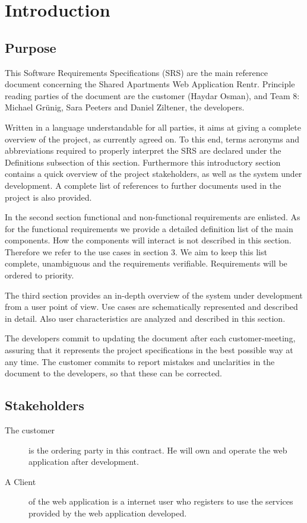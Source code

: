 \documentclass[a4wide]{article}
\title{}
\author{}
\begin{document}

\tableofcontents
\clearpage
\section{Introduction}
\subsection{Purpose}
This Software Requirements Specifications (SRS) are the main reference document concerning the Shared Apartments Web Application Rentr. Principle reading parties of the document are the customer (Haydar Osman), and Team 8: Michael Grünig, Sara Peeters and Daniel Ziltener, the developers.

Written in a language understandable for all parties, it aims at giving a complete overview of the project, as currently agreed on. To this end, terms acronyms and abbreviations required to properly interpret the SRS are declared under the Definitions subsection of this section. Furthermore this introductory section contains a quick overview of the project stakeholders, as well as the system under development. A complete list of references to further documents used in the project is also provided.

In the second section functional and non-functional requirements are enlisted. As for the functional requirements we provide a detailed definition list of the main components. How the components will interact is not described in this section. Therefore we refer to the use cases in section 3. We aim to keep this list complete, unambiguous and the requirements verifiable. Requirements will be ordered to priority.

The third section provides an in-depth overview of the system under development from a user point of view. Use cases are schematically represented and described in detail. Also user characteristics are analyzed and described in this section.


The developers commit to updating the document after each customer-meeting, assuring that it represents the project specifications in the best possible way at any time. The customer commits to report mistakes and unclarities in the document to the developers, so that these can be corrected.

\subsection{Stakeholders}
\begin{description}
\item[The customer]is the ordering party in this contract.  He will own and operate the web application after development. 
\item[A Client] of the web application is a internet user who registers to use the services provided by the web application developed.
\end{description}
\end{document}
